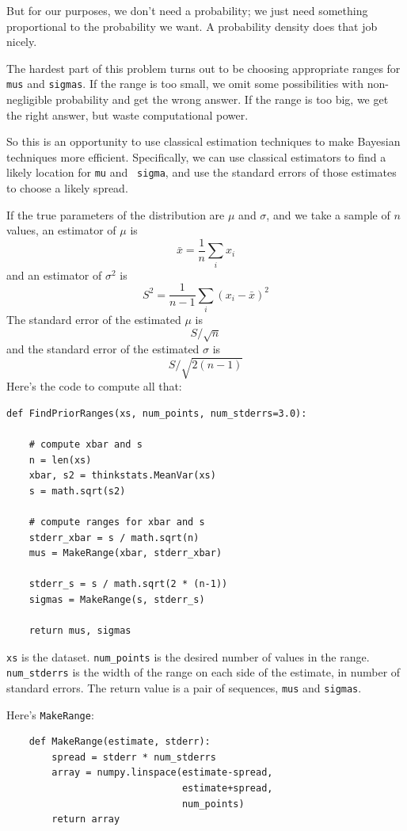 \documentclass[12pt]{book}
\begin{document}
But for our purposes, we don't need a probability; we just
need something proportional to the probability we want.
A probability density does that job nicely.

The hardest part of this problem turns
out to be choosing appropriate ranges for {\tt mus} and
{\tt sigmas}.  If the range is too small, we omit some
possibilities with non-negligible probability and get the
wrong answer.  If the range is too big, we get the right answer,
but waste computational power.

So this is an opportunity to use classical estimation techniques to
make Bayesian techniques more efficient.  Specifically, we can use
classical estimators to find a likely location for {\tt mu} and {\tt
  sigma}, and use the standard errors of those estimates to choose a
likely spread.

If the true parameters of the distribution are $\mu$ and
$\sigma$, and we take a sample of $n$ values, an estimator
of $\mu$ is
%
\[ \bar{x} = \frac{1}{n} \sum_i x_i \]
%
and an estimator of $\sigma^2$ is
%
\[ S^2 = \frac{1}{n-1} \sum_i (x_i - \bar{x})^2 \]
%
The standard error of the estimated $\mu$ is
%
\[ S / \sqrt{n} \]
%
and the standard error of the estimated $\sigma$ is
%
\[ S / \sqrt{2 (n-1)}\]
%
Here's the code to compute all that:

\begin{verbatim}
def FindPriorRanges(xs, num_points, num_stderrs=3.0):

    # compute xbar and s
    n = len(xs)
    xbar, s2 = thinkstats.MeanVar(xs)
    s = math.sqrt(s2)

    # compute ranges for xbar and s
    stderr_xbar = s / math.sqrt(n)
    mus = MakeRange(xbar, stderr_xbar)

    stderr_s = s / math.sqrt(2 * (n-1))
    sigmas = MakeRange(s, stderr_s)

    return mus, sigmas
\end{verbatim}

{\tt xs} is the dataset.  \verb"num_points" is the desired number of
values in the range.  \verb"num_stderrs" is the width of the range on
each side of the estimate, in number of standard errors.  The return
value is a pair of sequences, {\tt mus} and {\tt sigmas}.

Here's {\tt MakeRange}:

\begin{verbatim}
    def MakeRange(estimate, stderr):
        spread = stderr * num_stderrs
        array = numpy.linspace(estimate-spread,
                               estimate+spread,
                               num_points)
        return array
\end{verbatim}
\end{document}
